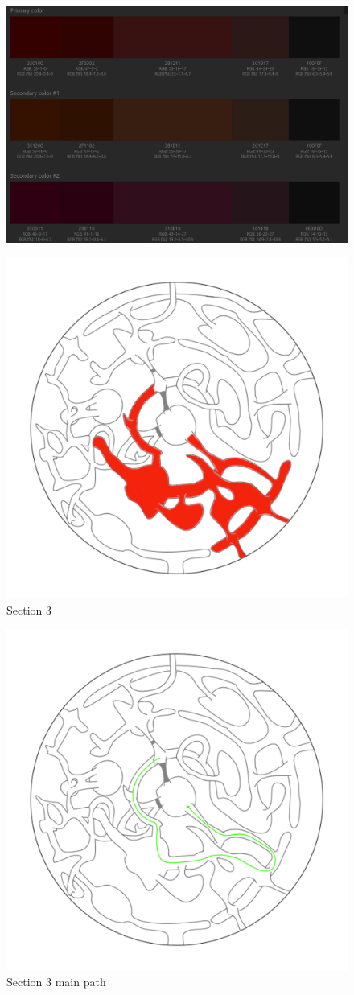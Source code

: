 \begin{figure}[H]
	\centering
	\includegraphics[width=0.8\linewidth]{images/visual_ref/15_giant_chasm/pallette/pallette_section_03.png}
\end{figure}

\begin{figure}[H]
	\centering
	\includegraphics[width=0.7\linewidth]{images/map/2D_map_section_03.png}
	\caption*{Section 3}
\end{figure}

\begin{figure}[H]
	\centering
	\includegraphics[width=0.7\linewidth]{images/map/map_principle_path_section_03.png}
	\caption*{Section 3 main path}
\end{figure}


